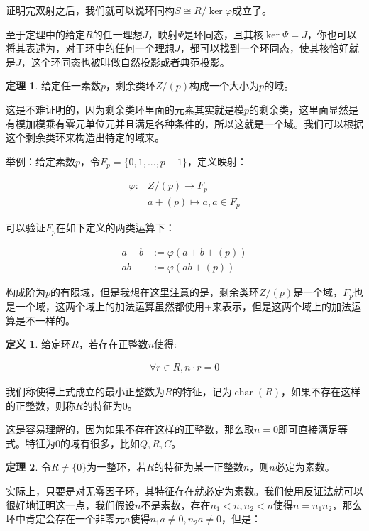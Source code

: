 \documentclass[12pt, a4paper, oneside]{ctexart}
\theoremstyle{definition}
\newtheorem*{definition}{定义}
\newtheorem*{theorem}{定理}
\begin{document}
证明完双射之后，我们就可以说环同构$S\cong R/\ker\varphi$成立了。

至于定理中的给定$R$的任一理想$J$，映射$\Psi$是环同态，且其核$\ker\Psi=J$，你也可以将其表述为，对于环中的任何一个理想$J$，都可以找到一个环同态，使其核恰好就是$J$，这个环同态也被叫做自然投影或者典范投影。

\begin{theorem}
给定任一素数$p$，剩余类环$Z/(p)$构成一个大小为$p$的域。
\end{theorem}

这是不难证明的，因为剩余类环里面的元素其实就是模$p$的剩余类，这里面显然是有模加模乘有零元单位元并且满足各种条件的，所以这就是一个域。我们可以根据这个剩余类环来构造出特定的域来。

举例：给定素数$p$，令$F_p=\{0,1,...,p-1\}$，定义映射：

\begin{align*}
\varphi:&Z/(p)\rightarrow F_p\\
&a+(p)\mapsto a,a\in F_p
\end{align*}

可以验证$F_p$在如下定义的两类运算下：

\begin{align*}
a+b &:=\varphi(a+b+(p))\\
ab &:=\varphi(ab+(p))
\end{align*}

构成阶为$p$的有限域，但是我想在这里注意的是，剩余类环$Z/(p)$是一个域，$F_p$也是一个域，这两个域上的加法运算虽然都使用+来表示，但是这两个域上的加法运算是不一样的。

\begin{definition}
给定环$R$，若存在正整数$n$使得:

\begin{align*}
\forall r\in R, n\cdot r=0
\end{align*}

我们称使得上式成立的最小正整数为$R$的特征，记为$\operatorname{char}(R)$，如果不存在这样的正整数，则称$R$的特征为0。
\end{definition}

这是容易理解的，因为如果不存在这样的正整数，那么取$n=0$即可直接满足等式。特征为0的域有很多，比如$Q,R,C$。

\begin{theorem}
令$R\neq\{0\}$为一整环，若$R$的特征为某一正整数$n$，则$n$必定为素数。
\end{theorem}

实际上，只要是对无零因子环，其特征存在就必定为素数。我们使用反证法就可以很好地证明这一点，我们假设$n$不是素数，存在$n_1<n,n_2<n$使得$n=n_1n_2$，那么环中肯定会存在一个非零元$a$使得$n_1a\neq 0,n_2a\neq 0$，但是：
\end{document}
